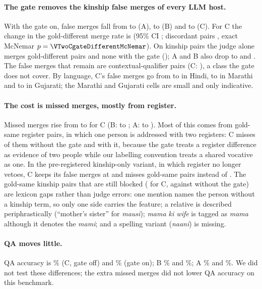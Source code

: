 \paragraph{The gate removes the kinship false merges of every LLM host.} With the gate on, false merges fall from \VTwoAOffFCR{} to
\VTwoALexFCR{} (A), \VTwoBOffFCR{} to \VTwoBLexFCR{} (B) and \VTwoCOffFCR{} to \VTwoCLexFCR{} (C). For C the change in the
gold-different merge rate is \VTwoCgateDifferentDiff{} (95\% CI \VTwoCgateDifferentDiffci{}; discordant pairs
\VTwoCgateDifferentDiscordant{}, exact McNemar $p=\VTwoCgateDifferentMcNemar$). On kinship pairs the judge alone merges
\VTwoCOffKinFCR{} gold-different pairs and none with the gate (\VTwoCLexKinFCR{}); A and B also drop to \VTwoALexKinFCR{} and
\VTwoBLexKinFCR{}. The false merges that remain are contextual-qualifier pairs (C: \VTwoCLexQualFCR{}), a class the gate does not cover.
By language, C's false merges go from \VTwoCOffHiFCR{} to \VTwoCLexHiFCR{} in Hindi, \VTwoCOffMrFCR{} to \VTwoCLexMrFCR{} in Marathi
and \VTwoCOffGuFCR{} to \VTwoCLexGuFCR{} in Gujarati; the Marathi and Gujarati cells are small and only indicative.

\paragraph{The cost is missed merges, mostly from register.} Missed merges rise from \VTwoCOffMCR{} to \VTwoCLexMCR{} for C (B:
\VTwoBOffMCR{} to \VTwoBLexMCR{}; A: \VTwoAOffMCR{} to \VTwoALexMCR{}). Most of this comes from gold-same register pairs, in which one
person is addressed with two registers: C misses \VTwoCOffRegMCR{} of them without the gate and \VTwoCLexRegMCR{} with it, because
the gate treats a register difference as evidence of two people while our labelling convention treats a shared vocative as one. In
the pre-registered kinship-only variant, in which register no longer vetoes, C keeps its false merges at \VTwoCLexKOFCR{} and misses
\VTwoCLexKOMCR{} gold-same pairs instead of \VTwoCLexMCR{}. The gold-same kinship pairs that are still blocked (\VTwoCLexKinMCR{}
for C, against \VTwoCOffKinMCR{} without the gate) are lexicon gaps rather than judge errors: one mention names the person without a
kinship term, so only one side carries the feature; a relative is described periphrastically (``mother's sister'' for
\emph{mausi}); \emph{mama ki wife} is tagged as \emph{mama} although it denotes the \emph{mami}; and a spelling variant
(\emph{naani}) is missing.

\paragraph{QA moves little.} QA accuracy is \VTwoCOffQApct\% (C, gate off) and \VTwoCLexQApct\% (gate on); B \VTwoBOffQApct\% and
\VTwoBLexQApct\%; A \VTwoAOffQApct\% and \VTwoALexQApct\%. We did not test these differences; the extra missed merges did not lower
QA accuracy on this benchmark.


